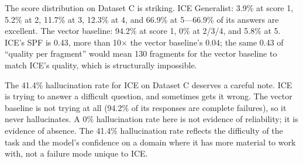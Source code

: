 \documentclass[10pt]{article}
\begin{document}
\begin{table}[htbp]
\centering
\small
\caption{ICE-Dev stress test (154 probes). The vector baseline collapses to a 94.2\% failure rate on the technical-planning conversation because it has no token-budget cap. ICE survives the same conversation with a mean score of 4.33 and 77\% fewer tokens injected. Note: the vector baseline's 0\% hallucination rate is misleading---94.2\% of its responses are complete failures (score 1), so there is no answer to evaluate for hallucination.}
\label{tab:stress}
\end{table}

The score distribution on Dataset C is striking. ICE Generalist: 3.9\% at score 1, 5.2\% at 2, 11.7\% at 3, 12.3\% at 4, and 66.9\% at 5---66.9\% of its answers are excellent. The vector baseline: 94.2\% at score 1, 0\% at 2/3/4, and 5.8\% at 5. ICE's SPF is 0.43, more than 10$\times$ the vector baseline's 0.04; the same 0.43 of ``quality per fragment'' would mean 130 fragments for the vector baseline to match ICE's quality, which is structurally impossible.

The 41.4\% hallucination rate for ICE on Dataset C deserves a careful note. ICE is trying to answer a difficult question, and sometimes gets it wrong. The vector baseline is not trying at all (94.2\% of its responses are complete failures), so it never hallucinates. A 0\% hallucination rate here is not evidence of reliability; it is evidence of absence. The 41.4\% hallucination rate reflects the difficulty of the task and the model's confidence on a domain where it has more material to work with, not a failure mode unique to ICE.
\end{document}
